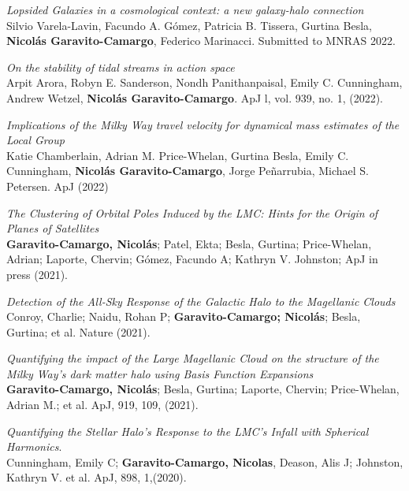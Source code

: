 \documentclass[UTF8]{article}
\begin{document}
\begin{etaremune}
\item \textit{Lopsided Galaxies in a cosmological context: a new galaxy-halo connection}\\ 
Silvio Varela-Lavin, Facundo A. Gómez, Patricia B. Tissera, Gurtina Besla, \textbf{Nicolás Garavito-Camargo}, Federico Marinacci. Submitted to MNRAS 2022.\\ 

\item \textit{On the stability of tidal streams in action space}\\
  Arpit Arora, Robyn E. Sanderson, Nondh Panithanpaisal, Emily C. Cunningham, Andrew Wetzel, \textbf{Nicol\'as Garavito-Camargo}. ApJ l, vol. 939, no. 1, (2022). 


\item \textit{Implications of the Milky Way travel velocity for dynamical mass
  estimates of the Local Group}\\
  Katie Chamberlain, Adrian M. Price-Whelan, Gurtina Besla, Emily C. Cunningham, \textbf{Nicol\'as Garavito-Camargo}, Jorge Peñarrubia, Michael S. Petersen. ApJ (2022)\\  

\item \textit{The Clustering of Orbital Poles Induced by the LMC: Hints for
      the Origin of Planes of Satellites}\\ 
      \textbf{Garavito-Camargo, Nicol\'as}; Patel, Ekta; Besla, Gurtina; Price-Whelan,
      Adrian; Laporte, Chervin; G\'omez, Facundo A; Kathryn V. Johnston; ApJ
      in press (2021). 


\item \textit{Detection of the All-Sky Response of the Galactic
  Halo to the Magellanic Clouds}\\ 
  Conroy, Charlie; Naidu, Rohan P; \textbf{Garavito-Camargo; Nicol\'as}; Besla,
  Gurtina; et al. Nature (2021). 

\item \textit{Quantifying the impact of the Large Magellanic Cloud on the
  structure of the Milky Way’s dark matter halo using Basis Function Expansions}\\ 
  \textbf{Garavito-Camargo, Nicol\'as}; Besla, Gurtina; Laporte,
  Chervin; Price-Whelan, Adrian M.; et al. ApJ, 919, 109, (2021). 

\item \textit{Quantifying the Stellar Halo's Response to the LMC's Infall with
  Spherical Harmonics}.\\
  Cunningham, Emily C; \textbf{Garavito-Camargo, Nicolas}, Deason, Alis J;
  Johnston, Kathryn V. et al. ApJ, 898, 1,(2020).


\end{etaremune}
\end{document}
